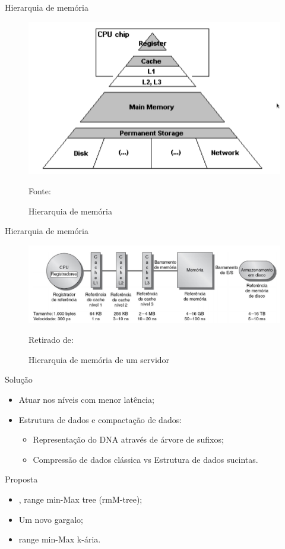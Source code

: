 \begin{frame}{Hierarquia de memória}
	\begin{figure}[h!]
        \centering
        \includegraphics[scale=0.3]{images/hierarquia-memory-2.png}
        
        \caption{Hierarquia de memória}
        \footnotesize{Fonte: \cite{paper-gap-between-processor-memory}}
    \end{figure} 
\end{frame}

\begin{frame}{Hierarquia de memória}
	\begin{figure}[h!]
        \centering
        \includegraphics[width=\columnwidth]{images/hierarquia-memory.png}
        \caption{Hierarquia de memória de um servidor}
        \footnotesize{Retirado de: \cite{book-computer-architecutre}}
    \end{figure} 
\end{frame}

\begin{frame}{Solução}
    \begin{itemize}
        \item Atuar nos níveis com menor latência;
        \item Estrutura de dados e compactação de dados:
        \begin{itemize}
            \item Representação do DNA através de árvore de sufixos;
            \item Compressão de dados clássica vs Estrutura de dados sucintas.
        \end{itemize}
    \end{itemize}
\end{frame}

\begin{frame}{Proposta}
    \begin{itemize}
        \item \cite{paper-fully-functinal-succint-trees}, range min-Max tree (rmM-tree);
        \item Um novo gargalo;
        \item range min-Max k-ária.
    \end{itemize}
\end{frame}